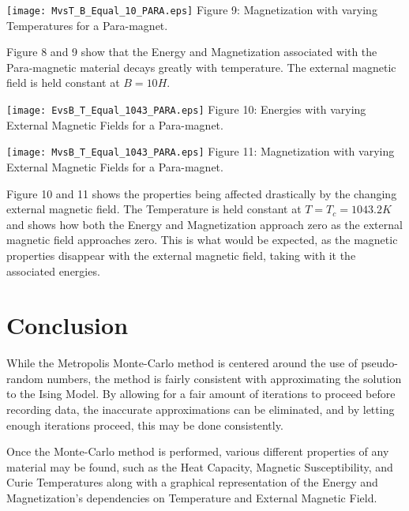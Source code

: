 \documentclass{article}
\begin{document}
\begin{multicols}{2}
\begin{center}
\texttt{[image: MvsT\_B\_Equal\_10\_PARA.eps]}
\scriptsize{
Figure 9: Magnetization with varying Temperatures for a Para-magnet.
}
\end{center}

Figure 8 and 9 show that the Energy and Magnetization associated with the Para-magnetic material decays greatly with temperature. The external magnetic field is held constant at $B = 10H$.

\vspace{1.1in}

\begin{center}
\texttt{[image: EvsB\_T\_Equal\_1043\_PARA.eps]}
\scriptsize{
Figure 10: Energies with varying External Magnetic Fields for a Para-magnet.
}
\end{center}


\begin{center}
\texttt{[image: MvsB\_T\_Equal\_1043\_PARA.eps]}
\scriptsize{
Figure 11: Magnetization with varying External Magnetic Fields for a Para-magnet.
}
\end{center}

Figure 10 and 11 shows the properties being affected drastically by the changing external magnetic field. The Temperature is held constant at $T = T_c = 1043.2 K$ and shows how both the Energy and Magnetization approach zero as the external magnetic field approaches zero. This is what would be expected, as the magnetic properties disappear with the external magnetic field, taking with it the associated energies.

\section{Conclusion}
While the Metropolis Monte-Carlo method is centered around the use of pseudo-random numbers, the method is fairly consistent with approximating the solution to  the Ising Model. By allowing for a fair amount of iterations to proceed before recording data, the inaccurate approximations can be eliminated, and by letting enough iterations proceed, this may be done consistently. 

Once the Monte-Carlo method is performed, various different properties of any material may be found, such as the Heat Capacity, Magnetic Susceptibility, and Curie Temperatures along with a graphical representation of the Energy and Magnetization's dependencies on Temperature and External Magnetic Field. 

\end{multicols}
\end{document}
